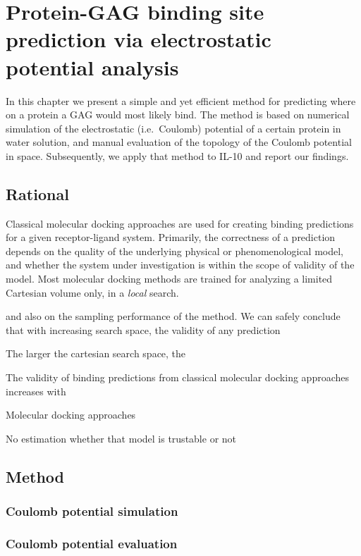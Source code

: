 \chapter{Protein-GAG binding site prediction via electrostatic potential analysis}

In this chapter we present a simple and yet efficient method for predicting
where on a protein a GAG would most likely bind. The method is based on
numerical simulation of the electrostatic (i.e.\ Coulomb) potential of a certain
protein in water solution, and manual evaluation of the topology of the Coulomb
potential in space. Subsequently, we apply that method to IL-10 and report our
findings.

\section{Rational}

Classical molecular docking approaches are used for creating binding predictions
for a given receptor-ligand system. Primarily, the correctness of a prediction
depends on the quality of the underlying physical or phenomenological model, and
whether the system under investigation is within the scope of validity of the
model. Most molecular docking methods are trained for analyzing a limited
Cartesian volume only, in a \textit{local} search.



 and
also on the sampling performance of the method. We can safely conclude that with
increasing search space, the validity of any prediction

The larger the cartesian search space, the

The validity of binding predictions from classical molecular docking approaches
increases with

Molecular docking approaches

No estimation whether that model is trustable or not

\section{Method}

\subsection{Coulomb potential simulation}

\subsection{Coulomb potential evaluation}

